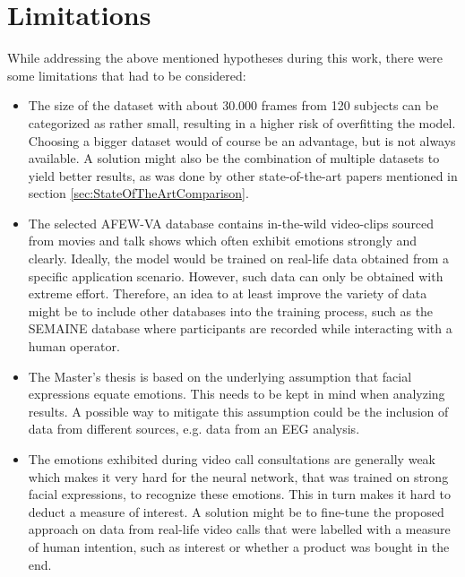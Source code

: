 \section{Limitations}
While addressing the above mentioned hypotheses during this work, there were some limitations that had to be considered:

\begin{itemize}
    \item The size of the dataset with about 30.000 frames from 120 subjects can be categorized as rather small, resulting in a higher risk of overfitting the model. Choosing a bigger dataset would of course be an advantage, but is not always available. A solution might also be the combination of multiple datasets to yield better results, as was done by other state-of-the-art papers mentioned in section \ref{sec:StateOfTheArtComparison}.
    \item The selected AFEW-VA database contains in-the-wild video-clips sourced from movies and talk shows which often exhibit emotions strongly and clearly. Ideally, the model would be trained on real-life data obtained from a specific application scenario. However, such data can only be obtained with extreme effort. Therefore, an idea to at least improve the variety of data might be to include other databases into the training process, such as the SEMAINE database where participants are recorded while interacting with a human operator.
    \item The Master's thesis is based on the underlying assumption that facial expressions equate emotions. This needs to be kept in mind when analyzing results. A possible way to mitigate this assumption could be the inclusion of data from different sources, e.g. data from an EEG analysis.
    \item The emotions exhibited during video call consultations are generally weak which makes it very hard for the neural network, that was trained on strong facial expressions, to recognize these emotions. This in turn makes it hard to deduct a measure of interest. A solution might be to fine-tune the proposed approach on data from real-life video calls that were labelled with a measure of human intention, such as interest or whether a product was bought in the end.
\end{itemize}

